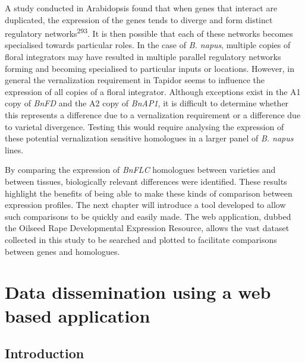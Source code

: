 \documentclass[12pt,]{book}
\begin{document}
A study conducted in Arabidopsis found that when genes that interact are
duplicated, the expression of the genes tends to diverge and form
distinct regulatory networks\textsuperscript{293}. It is then possible
that each of these networks becomes specialised towards particular
roles. In the case of \emph{B. napus}, multiple copies of floral
integrators may have resulted in multiple parallel regulatory networks
forming and becoming specialised to particular inputs or locations.
However, in general the vernalization requirement in Tapidor seems to
influence the expression of all copies of a floral integrator. Although
exceptions exist in the A1 copy of \emph{BnFD} and the A2 copy of
\emph{BnAP1}, it is difficult to determine whether this represents a
difference due to a vernalization requirement or a difference due to
varietal divergence. Testing this would require analysing the expression
of these potential vernalization sensitive homologues in a larger panel
of \emph{B. napus} lines.

By comparing the expression of \emph{BnFLC} homologues between varieties
and between tissues, biologically relevant differences were identified.
These results highlight the benefits of being able to make these kinds
of comparison between expression profiles. The next chapter will
introduce a tool developed to allow such comparisons to be quickly and
easily made. The web application, dubbed the Oilseed Rape Developmental
Expression Resource, allows the vast dataset collected in this study to
be searched and plotted to facilitate comparisons between genes and
homologues.

\chapter{Data dissemination using a web based
application}\label{chapter:website}

\section{Introduction}\label{introduction-1}
\end{document}
